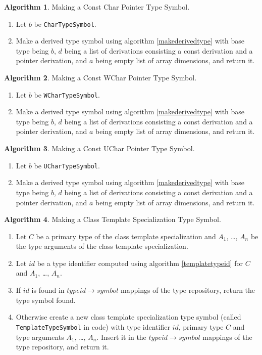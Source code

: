 \documentclass[a4paper,oneside,11pt]{book}
\theoremstyle{definition}
\newtheorem{algo}{Algorithm}[section]
\begin{document}
\begin{algo}\label{makeconstcharptrtype} Making a Const Char Pointer Type Symbol.
\begin{enumerate}
\item
Let $b$ be \verb|CharTypeSymbol|.
\item
Make a derived type symbol using algorithm \ref{makederivedtype} with base type being $b$, $d$ being a list of derivations consisting a const derivation and a pointer derivation, and $a$ being empty list of array dimensions, and return it.
\end{enumerate}
\end{algo}

\begin{algo}\label{makeconstwcharptrtype} Making a Const WChar Pointer Type Symbol.
\begin{enumerate}
\item
Let $b$ be \verb|WCharTypeSymbol|.
\item
Make a derived type symbol using algorithm \ref{makederivedtype} with base type being $b$, $d$ being a list of derivations consisting a const derivation and a pointer derivation, and $a$ being empty list of array dimensions, and return it.
\end{enumerate}
\end{algo}

\begin{algo}\label{makeconstucharptrtype} Making a Const UChar Pointer Type Symbol.
\begin{enumerate}
\item
Let $b$ be \verb|UCharTypeSymbol|.
\item
Make a derived type symbol using algorithm \ref{makederivedtype} with base type being $b$, $d$ being a list of derivations consisting a const derivation and a pointer derivation, and $a$ being empty list of array dimensions, and return it.
\end{enumerate}
\end{algo}

\begin{algo}\label{maketemplatetype} Making a Class Template Specialization Type Symbol.
\begin{enumerate}
\item
Let $C$ be a primary type of the class template specialization and $A_1$, \ldots, $A_n$ be the type arguments of the class template specialization.
\item
Let $id$ be a type identifier computed using algorithm \ref{templatetypeid} for $C$ and $A_1$, \ldots, $A_n$.
\item
If $id$ is found in $type id \rightarrow symbol$ mappings of the type repository, return the type symbol found.
\item
Otherwise create a new class template specialization type symbol (called \verb|TemplateTypeSymbol| in code)
with type identifier $id$, primary type $C$ and type arguments $A_1$, \ldots, $A_n$.
Insert it in the $type id \rightarrow symbol$ mappings of the type repository, and return it.
\end{enumerate}
\end{algo}
\end{document}
